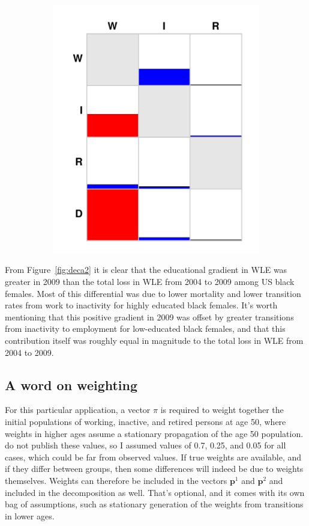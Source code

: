 \documentclass{article}
\begin{document}
\begin{figure}
\begin{subfigure}{.4\textwidth}
  \includegraphics[width=.7\linewidth]{Figures/decB.pdf}
\end{subfigure}
\end{figure}

From Figure~\ref{fig:deca2} it is clear that the educational gradient in WLE was
greater in 2009 than the total loss in WLE from 2004 to 2009 among US black
females. Most of this differential was due to lower mortality and lower
transition rates from work to inactivity for highly educated black females. It's
worth mentioning that this positive gradient in 2009 was offset by greater
transitions from inactivity to employment for low-educated black females, and
that this contribution itself was roughly equal in magnitude to the total loss
in WLE from 2004 to 2009.
\FloatBarrier

\subsection{A word on weighting}
For this particular application, a vector $\pi$ is required to weight together
the initial populations of working, inactive, and retired persons at age 50,
where weights in higher ages assume a stationary propagation of the age 50
population.
\citet{Dudel2017} do not publish these values, so I assumed values of 0.7,
0.25, and 0.05 for all cases, which could be far from observed values. If true
weights are available, and if they differ between groups, then some differences
will indeed be due to weights themselves. Weights can therefore be included in
the vectors $\textbf{p}^1$ and $\textbf{p}^2$ and included in the decomposition
as well. That's optional, and it comes with its own bag of assumptions, such as
stationary generation of the weights from transitions in lower ages.
\end{document}
